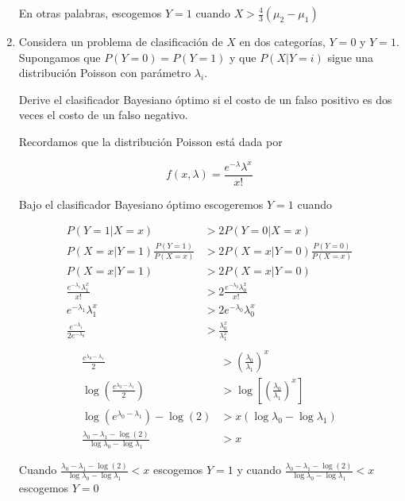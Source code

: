 \documentclass{article}
\begin{document}
\begin{enumerate}
En otras palabras, escogemos $Y = 1$ cuando $X > \frac{4}{3}(\mu_2 -\mu_1)$

\item Considera un problema de clasificación de $X$ en dos categorías, $Y = 0$ y $ Y = 1$. Supongamos que $P(Y = 0) = P(Y = 1)$ y que $P(X | Y = i)$ sigue una distribución Poisson con parámetro $\lambda_i$.

Derive el clasificador Bayesiano óptimo si el costo de un falso positivo es dos veces el costo de un falso negativo.

Recordamos que la distribución Poisson está dada por

$$ f(x, \lambda) = \frac{e^{-\lambda}\lambda^x}{x!}$$

Bajo el clasificador Bayesiano óptimo escogeremos $Y = 1$ cuando
\vspace{-3ex}
\begin{multicols}{2}
\small
\begin{align*}
P(Y = 1 | X = x) &> 2 P(Y = 0 | X = x)\\
P(X = x | Y = 1) \frac{P(Y = 1)}{P(X=x)} &> 2 P(X = x | Y = 0) \frac{P(Y=0)}{P(X=x)}\\
P(X = x | Y = 1)  &> 2 P(X = x | Y = 0) \\
\frac{e^{-\lambda_1}\lambda_1^x}{x!} &> 2\frac{e^{-\lambda_0}\lambda_0^x}{x!}\\
e^{-\lambda_1}\lambda_1^x &> 2 e^{-\lambda_0}\lambda_0^x\\
\frac{e^{-\lambda_1}}{2 e^{-\lambda_0}} &> \frac{\lambda_0^x}{\lambda_1^x}\\
\end{align*}\break
\begin{align*}
\frac{e^{\lambda_0 - \lambda_1}}{2 } &> \left(\frac{\lambda_0}{\lambda_1}\right)^x\\
\log\left(\frac{e^{\lambda_0 - \lambda_1}}{2 }\right) &> \log\left[\left(\frac{\lambda_0}{\lambda_1}\right)^x\right]\\
\log(e^{\lambda_0 - \lambda_1}) - \log(2) &> x (\log\lambda_0 - \log\lambda_1)\\
\frac{\lambda_0 - \lambda_1 - \log(2)}{\log\lambda_0 - \log\lambda_1} &> x
\end{align*}
\end{multicols}

Cuando $\frac{\lambda_0 - \lambda_1 - \log(2)}{\log\lambda_0 - \log\lambda_1} < x$ escogemos $Y = 1$ y cuando $\frac{\lambda_0 - \lambda_1 - \log(2)}{\log\lambda_0 - \log\lambda_1} < x$ escogemos $Y = 0$

\end{enumerate}
\end{document}
